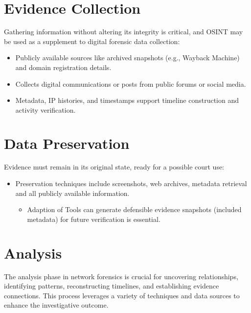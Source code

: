 \section{Evidence Collection}
Gathering information without altering its integrity is critical, and OSINT may be used as a supplement to digital forensic data collection:
\begin{itemize}
    \item Publicly available sources like archived snapshots (e.g., Wayback Machine) and domain registration details.
    \item Collects digital communications or posts from public forums or social media.
    \item Metadata, IP histories, and timestamps support timeline construction and activity verification.
\end{itemize}

\section{Data Preservation}
Evidence must remain in its original state, ready for a possible court use:
\begin{itemize}
    \item Preservation techniques include screenshots, web archives, metadata retrieval and all publicly available information.
    \begin{itemize}
        \item Adaption of Tools can generate defensible evidence snapshots (included metadata) for future verification is essential.
    \end{itemize}
\end{itemize}

\section{Analysis}
The analysis phase in network forensics is crucial for uncovering relationships, identifying patterns, reconstructing timelines, and establishing evidence connections. This process leverages a variety of techniques and data sources to enhance the investigative outcome.

